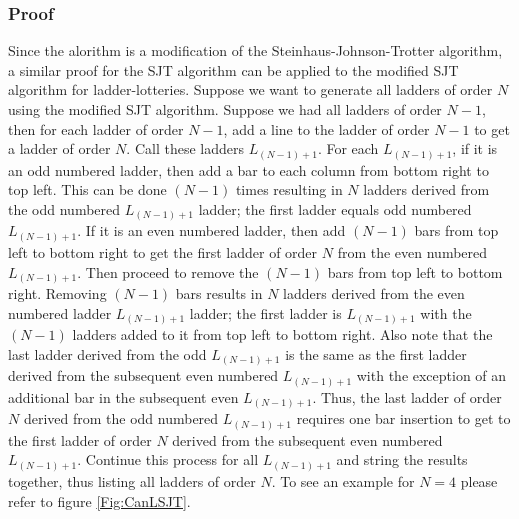 \subsubsection{Proof} 
Since the alorithm is a modification of the Steinhaus-Johnson-Trotter algorithm, a similar proof for the SJT algorithm 
can be applied to the modified SJT algorithm for ladder-lotteries. Suppose we want to generate all ladders 
of order $N$ using the modified SJT algorithm. Suppose we had all ladders of order $N-1$, then for 
each ladder of order $N-1$, add a line to the ladder of order $N-1$ to get a ladder of order $N$. Call these ladders 
$L_{(N-1)+1}$. For each $L_{(N-1)+1}$, if it is an odd numbered ladder, then add a bar to each column from bottom right 
to top left. This can be done $(N-1)$ times resulting in $N$ ladders derived from the odd numbered 
$L_{(N-1)+1}$ ladder; the first ladder equals odd numbered $L_{(N-1)+1}$. 
If it is an even numbered ladder, then add $(N-1)$ bars from top left to bottom right to get the first ladder 
of order $N$ from the even numbered $L_{(N-1)+1}$. Then proceed to remove the $(N-1)$ bars from top left to bottom right. 
Removing $(N-1)$ bars results in $N$ ladders derived from the even numbered ladder $L_{(N-1)+1}$ ladder; the first ladder 
is $L_{(N-1)+1}$ with the $(N-1)$ ladders added to it from top left to bottom right. Also note that the last ladder derived from 
the odd $L_{(N-1)+1}$ is the same as the first ladder derived from the subsequent even numbered $L_{(N-1)+1}$ with the exception 
of an additional bar in the subsequent even $L_{(N-1)+1}$. Thus, the last ladder of order $N$ derived from 
the odd numbered $L_{(N-1)+1}$ requires one bar insertion to get to the first ladder of order $N$ derived from the subsequent 
even numbered $L_{(N-1)+1}$. Continue this process for all $L_{(N-1)+1}$ and string the results together, thus 
listing all ladders of order $N$. To see an example for $N=4$ please refer to figure \ref{Fig:CanLSJT}.\pagebreak


